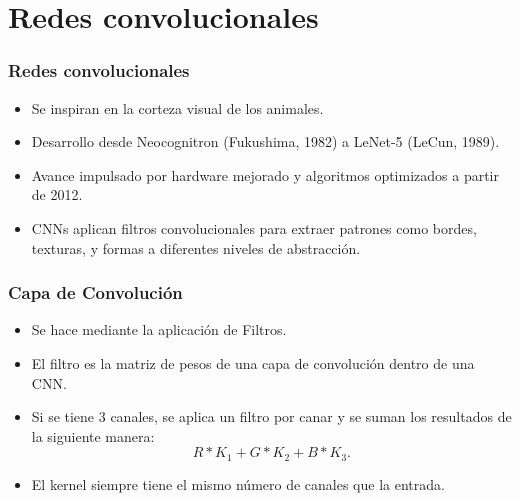 \section{Redes convolucionales}


\begin{frame}
    \frametitle{Redes convolucionales}

    \begin{itemize}
        \item Se inspiran en la corteza visual de los animales.
        \item Desarrollo desde Neocognitron (Fukushima, 1982) a LeNet-5 (LeCun, 1989).
        \item Avance impulsado por hardware mejorado y algoritmos optimizados a partir de 2012.
        \item CNNs aplican filtros convolucionales para extraer patrones como bordes, texturas, y formas a diferentes niveles de abstracción.
    \end{itemize}

    
\end{frame}

\begin{frame}
\centering
\end{frame}

\begin{frame}
    \frametitle{Capa de Convolución}

    \begin{itemize}[leftmargin=*]
    \item Se hace mediante la aplicación de Filtros.
    \item El filtro es la matriz de pesos de una capa de convolución dentro de una CNN.
    \item  Si se tiene 3 canales, se aplica un filtro por canar y se suman los resultados de la siguiente manera:
    \[
        R*K_1 + G*K_2 + B*K_3.
    \]
    \item El kernel siempre tiene el mismo número de canales que la entrada.
    \end{itemize}
    
\end{frame}

